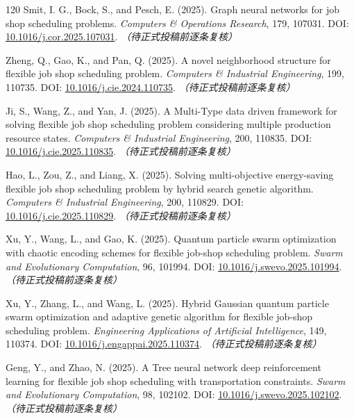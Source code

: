 \documentclass[UTF8,a4paper,11pt]{ctexart}
\begin{document}
\begin{thebibliography}{120}
Smit, I. G., Bock, S., and Pesch, E. (2025). Graph neural networks for job shop scheduling problems. \emph{Computers \& Operations Research}, 179, 107031.
\newblock DOI: \href{https://doi.org/10.1016/j.cor.2025.107031}{10.1016/j.cor.2025.107031}. \textit{（待正式投稿前逐条复核）}

Zheng, Q., Gao, K., and Pan, Q. (2025). A novel neighborhood structure for flexible job shop scheduling problem. \emph{Computers \& Industrial Engineering}, 199, 110735.
\newblock DOI: \href{https://doi.org/10.1016/j.cie.2024.110735}{10.1016/j.cie.2024.110735}. \textit{（待正式投稿前逐条复核）}

Ji, S., Wang, Z., and Yan, J. (2025). A Multi-Type data driven framework for solving flexible job shop scheduling problem considering multiple production resource states. \emph{Computers \& Industrial Engineering}, 200, 110835.
\newblock DOI: \href{https://doi.org/10.1016/j.cie.2025.110835}{10.1016/j.cie.2025.110835}. \textit{（待正式投稿前逐条复核）}

Hao, L., Zou, Z., and Liang, X. (2025). Solving multi-objective energy-saving flexible job shop scheduling problem by hybrid search genetic algorithm. \emph{Computers \& Industrial Engineering}, 200, 110829.
\newblock DOI: \href{https://doi.org/10.1016/j.cie.2025.110829}{10.1016/j.cie.2025.110829}. \textit{（待正式投稿前逐条复核）}

Xu, Y., Wang, L., and Gao, K. (2025). Quantum particle swarm optimization with chaotic encoding schemes for flexible job-shop scheduling problem. \emph{Swarm and Evolutionary Computation}, 96, 101994.
\newblock DOI: \href{https://doi.org/10.1016/j.swevo.2025.101994}{10.1016/j.swevo.2025.101994}. \textit{（待正式投稿前逐条复核）}

Xu, Y., Zhang, L., and Wang, L. (2025). Hybrid Gaussian quantum particle swarm optimization and adaptive genetic algorithm for flexible job-shop scheduling problem. \emph{Engineering Applications of Artificial Intelligence}, 149, 110374.
\newblock DOI: \href{https://doi.org/10.1016/j.engappai.2025.110374}{10.1016/j.engappai.2025.110374}. \textit{（待正式投稿前逐条复核）}

Geng, Y., and Zhao, N. (2025). A Tree neural network deep reinforcement learning for flexible job shop scheduling with transportation constraints. \emph{Swarm and Evolutionary Computation}, 98, 102102.
\newblock DOI: \href{https://doi.org/10.1016/j.swevo.2025.102102}{10.1016/j.swevo.2025.102102}. \textit{（待正式投稿前逐条复核）}


\end{thebibliography}
\end{document}
